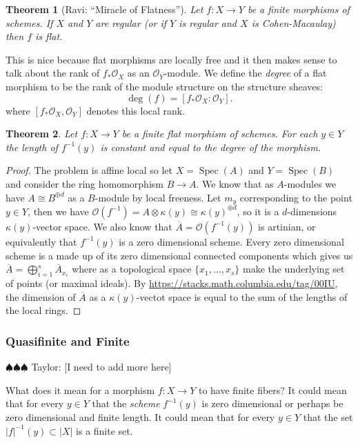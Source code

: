 \documentclass[12pt]{article}
\numberwithin{equation}{section}
\newtheorem{theorem}{Theorem}[subsection]
\theoremstyle{definition}
\theoremstyle{remark}
\newcommand{\Ocal}{\mathcal{O}}
\newcommand{\Spec}{\operatorname{Spec}}
\newcommand{\taylor}[1]{{\color{blue} \sf $\spadesuit\spadesuit\spadesuit$ Taylor: [#1]}}
\begin{document}
\begin{theorem}[Ravi: ``Miracle of Flatness'']
	Let $f:X\to Y$ be a finite morphisms of schemes. 
	If $X$ and $Y$ are regular (or if $Y$ is regular and $X$ is Cohen-Macaulay) then $f$ is flat. 
\end{theorem}
This is nice because flat morphisms are locally free and it then makes sense to talk about the rank of $f_*\Ocal_X$ as an $\Ocal_Y$-module.
We define the \emph{degree} of a flat morphism to be the rank of the module structure on the structure sheaves:
$$\deg(f) = [f_*\Ocal_X:\Ocal_Y].$$
where $[f_*\Ocal_X,\Ocal_Y]$ denotes this local rank.
\begin{theorem}
	Let $f:X \to Y$ be a finite flat morphism of schemes. 
	For each $y\in Y$ the length of $f^{-1}(y)$ is constant and equal to the degree of the morphism. 
\end{theorem}
\begin{proof}
	The problem is affine local so let $X=\Spec(A)$ and $Y=\Spec(B)$ and consider the ring homomorphism $B\to A$.
	We know that as $A$-modules we have $A\cong B^{\oplus d}$ as a $B$-module by local freeness.
	Let $m_y$ corresponding to the point $y\in Y$, then we have $\Ocal(f^{-1})=A\otimes \kappa(y) \cong \kappa(y)^{\oplus d}$, so it is a $d$-dimensions $\kappa(y)$-vector space. 
	We also know that $\overline{A}=\Ocal(f^{-1}(y))$ is artinian, or equivalently that $f^{-1}(y)$ is a zero dimensional scheme. 
	Every zero dimensional scheme is a made up of its zero dimensional connected components which gives us $\overline{A}= \bigoplus_{i=1}^s \overline{A}_{x_i}$ where as a topological space $\lbrace x_1,\ldots,x_s\rbrace$ make the underlying set of points (or maximal ideals). 
	By \url{https://stacks.math.columbia.edu/tag/00IU}, the dimension of $\overline{A}$ as a $\kappa(y)$-vectot space is equal to the sum of the lengths of the local rings.
\end{proof}

\subsubsection{Quasifinite and Finite}

\taylor{I need to add more here}

What does it mean for a morphism $f:X\to Y$ to have finite fibers?
It could mean that for every $y\in Y$ that the \emph{scheme} $f^{-1}(y)$ is zero dimensional or perhaps be zero dimensional and finite length.
It could mean that for every $y \in Y$ that the set $\vert f\vert^{-1}(y) \subset \vert X \vert$ is a finite set.
\end{document}
